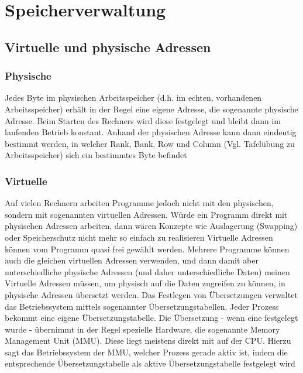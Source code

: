 \section{Speicherverwaltung}
	\subsection{Virtuelle und physische Adressen}
		\subsubsection{Physische}
			Jedes Byte im physischen Arbeitsspeicher (d.h. im echten, vorhandenen Arbeitsspeicher) erhält in der Regel eine eigene Adresse, die sogenannte physische Adresse. Beim Starten des Rechners wird diese festgelegt und bleibt dann im laufenden Betrieb konstant. Anhand der physischen Adresse kann dann eindeutig bestimmt werden, in welcher Rank, Bank, Row und Column (Vgl. Tafelübung zu Arbeitsspeicher) sich ein bestimmtes Byte befindet
		\subsubsection{Virtuelle}
			Auf vielen Rechnern arbeiten Programme jedoch nicht mit den physischen, sondern mit sogenannten virtuellen Adressen. Würde ein Programm direkt mit physischen Adressen arbeiten, dann wären Konzepte wie Auslagerung (Swapping) oder Speicherschutz nicht mehr so einfach zu realisieren \newline \newline
			Virtuelle Adressen können vom Programm quasi frei gewählt werden. Mehrere Programme können auch die gleichen virtuellen Adressen verwenden, und dann damit aber unterschiedliche physische Adressen (und daher unterschiedliche Daten) meinen \newline \newline
			Virtuelle Adressen müssen, um physisch auf die Daten zugreifen zu können, in physische Adressen übersetzt werden. Das Festlegen von Übersetzungen verwaltet das Betriebssystem mittels sogenannter Übersetzungstabellen. Jeder Prozess bekommt eine eigene Übersetzungstabelle. Die Übersetzung - wenn eine festgelegt wurde - übernimmt in der Regel spezielle Hardware, die sogenannte Memory Management Unit (MMU). Diese liegt meistens direkt mit auf der CPU. Hierzu sagt das Betriebssystem der MMU, welcher Prozess gerade aktiv ist, indem die entsprechende Übersetzungstabelle als aktive Übersetzungstabelle festgelegt wird
